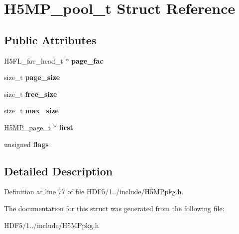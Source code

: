 \hypertarget{struct_h5_m_p__pool__t}{}\section{H5\+M\+P\+\_\+pool\+\_\+t Struct Reference}
\label{struct_h5_m_p__pool__t}
\subsection*{Public Attributes}
\begin{DoxyCompactItemize}
\item 
\mbox{\label{struct_h5_m_p__pool__t_ae4bc15955ba3f7349f00c2bdb521a6ca}} 
H5\+F\+L\+\_\+fac\+\_\+head\+\_\+t $\ast$ {\bfseries page\+\_\+fac}
\item 
\mbox{\label{struct_h5_m_p__pool__t_a60e3dcf7eab42d36765dcfaf419b0e0b}} 
size\+\_\+t {\bfseries page\+\_\+size}
\item 
\mbox{\label{struct_h5_m_p__pool__t_a61ba432feead48c0eb74bd391755fd3c}} 
size\+\_\+t {\bfseries free\+\_\+size}
\item 
\mbox{\label{struct_h5_m_p__pool__t_a08805c12c8f30d72edc816ed2ed5afaa}} 
size\+\_\+t {\bfseries max\+\_\+size}
\item 
\mbox{\label{struct_h5_m_p__pool__t_ac4b31240338d3c4ac6e90177edb0f2a8}} 
\hyperlink{struct_h5_m_p__page__t}{H5\+M\+P\+\_\+page\+\_\+t} $\ast$ {\bfseries first}
\item 
\mbox{\label{struct_h5_m_p__pool__t_ad956a81dab059ea0f951760b8cff164b}} 
unsigned {\bfseries flags}
\end{DoxyCompactItemize}


\subsection{Detailed Description}


Definition at line \hyperlink{_h_d_f5_21_810_81_2include_2_h5_m_ppkg_8h_source_l00077}{77} of file \hyperlink{_h_d_f5_21_810_81_2include_2_h5_m_ppkg_8h_source}{H\+D\+F5/1../include/\+H5\+M\+Ppkg.\+h}.



The documentation for this struct was generated from the following file\+:\begin{DoxyCompactItemize}
\item 
H\+D\+F5/1../include/\+H5\+M\+Ppkg.\+h\end{DoxyCompactItemize}
